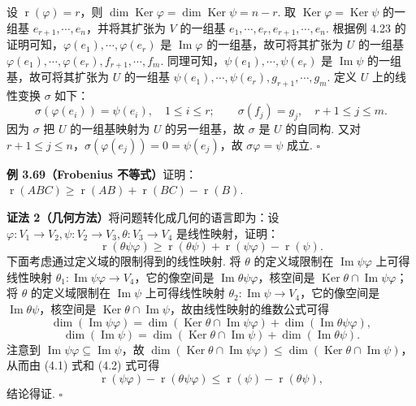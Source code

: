 \documentclass[UTF8,12pt,a4paper,fontset=fandol]{ctexart}
\begin{document}
设 $\operatorname{r}(\varphi)=r$，则 $\dim\operatorname{Ker}\varphi=\dim\operatorname{Ker}\psi=n-r$. 取 $\operatorname{Ker}\varphi=\operatorname{Ker}\psi$ 的一组基 $e_{r+1},\cdots,e_n$，并将其扩张为 $V$ 的一组基 $e_1,\cdots,e_r,e_{r+1},\cdots,e_n$. 根据例 4.23 的证明可知，$\varphi(e_1),\cdots,\varphi(e_r)$ 是 $\operatorname{Im}\varphi$ 的一组基，故可将其扩张为 $U$ 的一组基 $\varphi(e_1),\cdots,\varphi(e_r),f_{r+1},\cdots,f_m$. 同理可知，$\psi(e_1),\cdots,\psi(e_r)$ 是 $\operatorname{Im}\psi$ 的一组基，故可将其扩张为 $U$ 的一组基 $\psi(e_1),\cdots,\psi(e_r),g_{r+1},\cdots,g_m$. 定义 $U$ 上的线性变换 $\sigma$ 如下：
\[
\sigma(\varphi(e_i))=\psi(e_i),\quad 1\le i\le r;\qquad \sigma(f_j)=g_j,\quad r+1\le j\le m.
\]
因为 $\sigma$ 把 $U$ 的一组基映射为 $U$ 的另一组基，故 $\sigma$ 是 $U$ 的自同构. 又对 $r+1\le j\le n$，$\sigma(\varphi(e_j))=0=\psi(e_j)$，故 $\sigma\varphi=\psi$ 成立. $\square$

\noindent\textbf{例 3.69（Frobenius 不等式）}\quad 证明：$\operatorname{r}(ABC)\ge \operatorname{r}(AB)+\operatorname{r}(BC)-\operatorname{r}(B)$.

\noindent\textbf{证法 2（几何方法）}\quad 将问题转化成几何的语言即为：设 $\varphi:V_1\to V_2,\psi:V_2\to V_3,\theta:V_3\to V_4$ 是线性映射，证明：
\[
\operatorname{r}(\theta\psi\varphi)\ge \operatorname{r}(\theta\psi)+\operatorname{r}(\psi\varphi)-\operatorname{r}(\psi).
\]
下面考虑通过定义域的限制得到的线性映射. 将 $\theta$ 的定义域限制在 $\operatorname{Im}\psi\varphi$ 上可得线性映射 $\theta_1:\operatorname{Im}\psi\varphi\to V_4$，它的像空间是 $\operatorname{Im}\theta\psi\varphi$，核空间是 $\operatorname{Ker}\theta\cap\operatorname{Im}\psi\varphi$；将 $\theta$ 的定义域限制在 $\operatorname{Im}\psi$ 上可得线性映射 $\theta_2:\operatorname{Im}\psi\to V_4$，它的像空间是 $\operatorname{Im}\theta\psi$，核空间是 $\operatorname{Ker}\theta\cap\operatorname{Im}\psi$，故由线性映射的维数公式可得
\begin{equation}
\dim(\operatorname{Im}\psi\varphi)=\dim(\operatorname{Ker}\theta\cap\operatorname{Im}\psi\varphi)+\dim(\operatorname{Im}\theta\psi\varphi),
\tag{4.1}
\end{equation}
\begin{equation}
\dim(\operatorname{Im}\psi)=\dim(\operatorname{Ker}\theta\cap\operatorname{Im}\psi)+\dim(\operatorname{Im}\theta\psi).
\tag{4.2}
\end{equation}
注意到 $\operatorname{Im}\psi\varphi\subseteq\operatorname{Im}\psi$，故 $\dim(\operatorname{Ker}\theta\cap\operatorname{Im}\psi\varphi)\le \dim(\operatorname{Ker}\theta\cap\operatorname{Im}\psi)$，从而由 (4.1) 式和 (4.2) 式可得
\[
\operatorname{r}(\psi\varphi)-\operatorname{r}(\theta\psi\varphi)\le \operatorname{r}(\psi)-\operatorname{r}(\theta\psi),
\]
结论得证. $\square$
\end{document}
